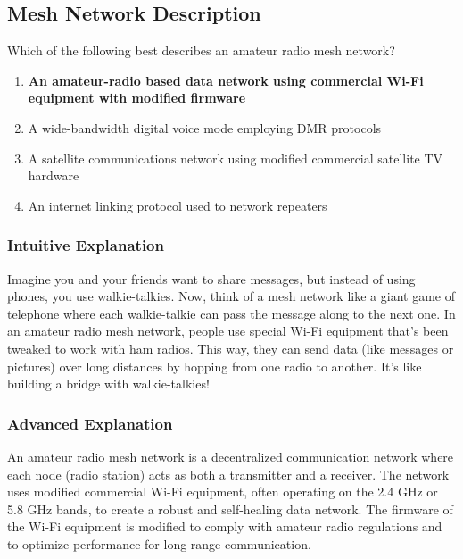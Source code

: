 \subsection{Mesh Network Description}
\label{T8D12}

\begin{tcolorbox}[colback=gray!10!white,colframe=black!75!black,title=T8D12]
Which of the following best describes an amateur radio mesh network?
\begin{enumerate}[label=\Alph*)]
    \item \textbf{An amateur-radio based data network using commercial Wi-Fi equipment with modified firmware}
    \item A wide-bandwidth digital voice mode employing DMR protocols
    \item A satellite communications network using modified commercial satellite TV hardware
    \item An internet linking protocol used to network repeaters
\end{enumerate}
\end{tcolorbox}

\subsubsection{Intuitive Explanation}
Imagine you and your friends want to share messages, but instead of using phones, you use walkie-talkies. Now, think of a mesh network like a giant game of telephone where each walkie-talkie can pass the message along to the next one. In an amateur radio mesh network, people use special Wi-Fi equipment that's been tweaked to work with ham radios. This way, they can send data (like messages or pictures) over long distances by hopping from one radio to another. It's like building a bridge with walkie-talkies!

\subsubsection{Advanced Explanation}
An amateur radio mesh network is a decentralized communication network where each node (radio station) acts as both a transmitter and a receiver. The network uses modified commercial Wi-Fi equipment, often operating on the 2.4 GHz or 5.8 GHz bands, to create a robust and self-healing data network. The firmware of the Wi-Fi equipment is modified to comply with amateur radio regulations and to optimize performance for long-range communication.

